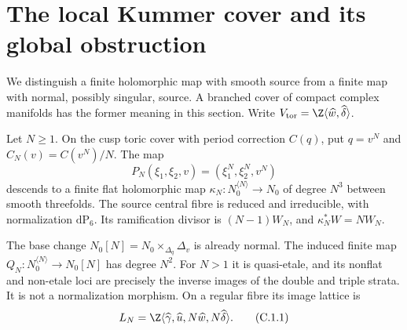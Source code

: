 \section{The local Kummer cover and its global obstruction}

We distinguish a finite holomorphic map with smooth source from a finite
map with normal, possibly singular, source. A branched cover of compact
complex manifolds has the former meaning in this section. Write
$V_{\rm tor}=\Z\langle\widehat w,\widehat\delta\rangle$.

\begin{theorem}\label{maps:src:C.1.1}


Let $N\geq1$. On the cusp toric cover with period correction $C(q)$,
put $q=v^N$ and $C_N(v)=C(v^N)/N$. The map
\[
 P_N(\xi_1,\xi_2,v)=(\xi_1^N,\xi_2^N,v^N)
\]
descends to a finite flat holomorphic map
$\kappa_N:N_0^{\langle N\rangle}\to N_0$ of degree $N^3$ between
smooth threefolds. The source central fibre is reduced and irreducible,
with normalization $\mathrm{dP}_6$. Its ramification divisor is
$(N-1)W_N$, and $\kappa_N^*W=NW_N$.

The base change $N_0[N]=N_0\times_{\Delta_q}\Delta_v$ is already normal.
The induced finite map $Q_N:N_0^{\langle N\rangle}\to N_0[N]$ has
degree $N^2$. For $N>1$ it is quasi-etale, and its nonflat and non-etale
loci are precisely the inverse images of the double and triple strata.
It is not a normalization morphism. On a regular fibre its image lattice is
\[
 L_N=\Z\langle\widehat\gamma,\widehat u,
                   N\widehat w,N\widehat\delta\rangle.
 \tag{C.1.1}\label{maps:eq:C.1.1}
\]

\end{theorem}


